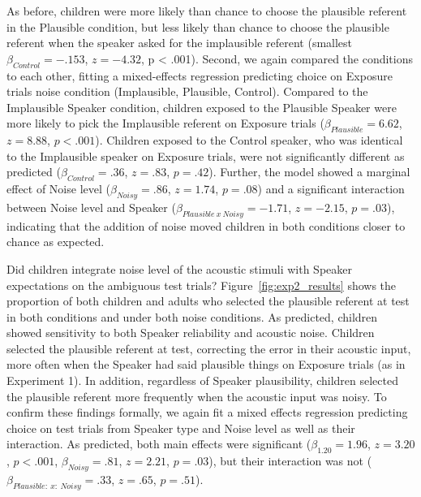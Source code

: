 \documentclass[man,floatsintext]{apa6}
\begin{document}
As before, children were more likely than chance to choose the plausible referent in the Plausible condition, but less likely than chance to choose the plausible referent when the speaker asked for the implausible referent (smallest $\beta_{Control} = -.153$, $z = -4.32$, p < .001). Second, we again compared the conditions to each other, fitting a mixed-effects regression predicting choice on Exposure trials noise condition (Implausible, Plausible, Control). Compared to the Implausible Speaker condition, children exposed to the Plausible Speaker were more likely to pick the Implausible referent on Exposure trials ($\beta_{Plausible} = 6.62$,  $z = 8.88$, $p <.001$). Children exposed to the Control speaker, who was identical to the Implausible speaker on Exposure trials, were not significantly different as predicted ($\beta_{Control} = .36$,  $z = .83$, $p = .42$). Further, the model showed a marginal effect of Noise level ($\beta_{Noisy} = .86$,  $z = 1.74$, $p = .08$) and a significant interaction between Noise level and Speaker ($\beta_{Plausible \: x \: Noisy} = -1.71$, $z= -2.15$, $p = .03$), indicating that the addition of noise moved children in both conditions closer to chance as expected.

Did children integrate noise level of the acoustic stimuli with Speaker expectations on the ambiguous test trials? Figure~\ref{fig:exp2_results} shows the proportion of both children and adults who selected the plausible referent at test in both conditions and under both noise conditions. As predicted, children showed sensitivity to both Speaker reliability and acoustic noise. Children selected the plausible referent at test, correcting the error in their acoustic input, more often when the Speaker had said plausible things on Exposure trials (as in Experiment 1). In addition, regardless of Speaker plausibility, children selected the plausible referent more frequently when the acoustic input was noisy. To confirm these findings formally, we again fit a mixed effects regression predicting choice on test trials from Speaker type and Noise level as well as their interaction. As predicted, both main effects were significant ($\beta_{1.20} = 1.96$,  $z = 3.20$, $p <.001$, $\beta_{Noisy} = .81$,  $z = 2.21$, $p = .03$), but their interaction was not ($\beta_{Plausible :\ x :\ Noisy} = .33$,  $z = .65$, $p = .51$).
\end{document}
